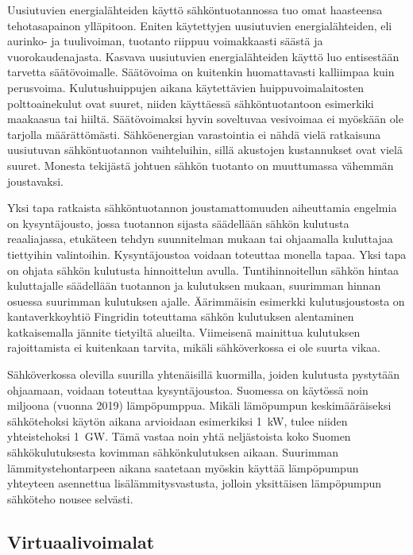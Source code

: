   Uusiutuvien energialähteiden käyttö sähköntuotannossa tuo omat haasteensa tehotasapainon ylläpitoon. Eniten käytettyjen uusiutuvien energialähteiden, eli aurinko- ja tuulivoiman, tuotanto riippuu voimakkaasti säästä ja vuorokaudenajasta. Kasvava uusiutuvien energialähteiden käyttö luo entisestään tarvetta säätövoimalle.\parencite{energiateollisuus} Säätövoima on kuitenkin huomattavasti kalliimpaa kuin perusvoima. Kulutushuippujen aikana käytettävien huippuvoimalaitosten polttoainekulut ovat suuret, niiden käyttäessä sähköntuotantoon esimerkiki maakaasua tai hiiltä. Säätövoimaksi hyvin soveltuvaa vesivoimaa ei myöskään ole tarjolla määrättömästi. Sähköenergian varastointia ei nähdä vielä ratkaisuna uusiutuvan sähköntuotannon vaihteluihin, sillä akustojen kustannukset ovat vielä suuret. Monesta tekijästä johtuen sähkön tuotanto on muuttumassa vähemmän joustavaksi.

  Yksi tapa ratkaista sähköntuotannon joustamattomuuden aiheuttamia engelmia on kysyntäjousto, jossa tuotannon sijasta säädellään sähkön kulutusta reaaliajassa, etukäteen tehdyn suunnitelman mukaan tai ohjaamalla kuluttajaa tiettyihin valintoihin. Kysyntäjoustoa voidaan toteuttaa monella tapaa.\parencite{fingrid} Yksi tapa on ohjata sähkön kulutusta hinnoittelun avulla. Tuntihinnoitellun sähkön hintaa kuluttajalle säädellään tuotannon ja kulutuksen mukaan, suurimman hinnan osuessa suurimman kulutuksen ajalle. Äärimmäisin esimerkki kulutusjoustosta on kantaverkkoyhtiö Fingridin toteuttama sähkön kulutuksen alentaminen katkaisemalla jännite tietyiltä alueilta. Viimeisenä mainittua kulutuksen rajoittamista ei kuitenkaan tarvita, mikäli sähköverkossa ei ole suurta vikaa.

  Sähköverkossa olevilla suurilla yhtenäisillä kuormilla, joiden kulutusta pystytään ohjaamaan, voidaan toteuttaa kysyntäjoustoa\parencite{fingrid}. Suomessa on käytössä noin miljoona (vuonna 2019) lämpöpumppua\parencite{sulpu}. Mikäli lämöpumpun keskimääräiseksi sähkötehoksi käytön aikana arvioidaan esimerkiksi \SI{1}{\kilo\watt}, tulee niiden yhteistehoksi \SI{1}{\giga\watt}. Tämä vastaa noin yhtä neljästoista koko Suomen sähkökulutuksesta kovimman sähkönkulutuksen aikaan. Suurimman lämmitystehontarpeen aikana saatetaan myöskin käyttää lämpöpumpun yhteyteen asennettua lisälämmitysvastusta, jolloin yksittäisen lämpöpumpun sähköteho nousee selvästi.

\subsection{Virtuaalivoimalat}

